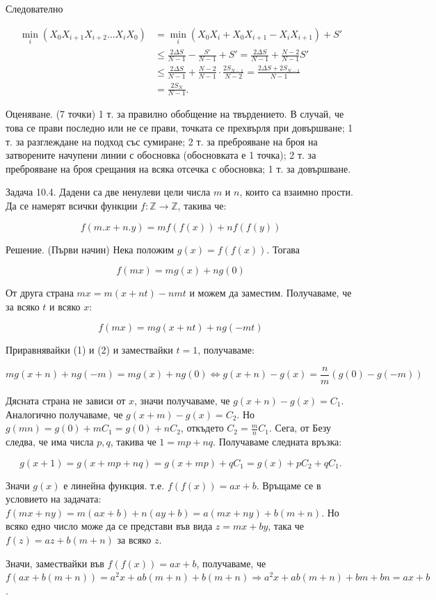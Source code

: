 Следователно

$$\begin{aligned}
\min_i(X_0X_{i+1}X_{i+2}\ldots X_iX_0)
&=\min_i(X_0X_i+X_0X_{i+1}-X_iX_{i+1})+S'\\
&\le\frac{2\Delta S}{N-1}-\frac{S'}{N-1}+S'=\frac{2\Delta S}{N-1}+\frac{N-2}{N-1}S'\\
&\le\frac{2\Delta S}{N-1}+\frac{N-2}{N-1}\cdot\frac{2S_{N-1}}{N-2}=\frac{2\Delta S+2S_{N-1}}{N-1}\\
&=\frac{2S_N}{N-1}.
\end{aligned}$$

Оценяване. (7 точки) 1 т. за правилно обобщение на твърдението. В случай, че това се прави последно или не се прави, точката се прехвърля при довършване; 1 т. за разглеждане на подход със сумиране; 2 т. за преброяване на броя на затворените начупени линии с обосновка (обосновката е 1 точка); 2 т. за преброяване на броя срещания на всяка отсечка с обосновка; 1 т. за довършване.

Задача 10.4. Дадени са две ненулеви цели числа $m$ и $n$, които са взаимно прости. Да се намерят всички функции $f:\mathbb Z\to\mathbb Z$, такива че:

$$f(m.x+n.y)=mf(f(x))+nf(f(y))$$

Решение. (Първи начин) Нека положим $g(x)=f(f(x))$. Тогава

$$f(mx)=mg(x)+ng(0)\tag{1}$$

От друга страна $mx=m(x+nt)-nmt$ и можем да заместим. Получаваме, че за всяко $t$ и всяко $x$:

$$f(mx)=mg(x+nt)+ng(-mt)\tag{2}$$

Приравнявайки (1) и (2) и замествайки $t=1$, получаваме:

$$mg(x+n)+ng(-m)=mg(x)+ng(0)\Longleftrightarrow g(x+n)-g(x)=\frac{n}{m}(g(0)-g(-m))\tag{3}$$

Дясната страна не зависи от $x$, значи получаваме, че $g(x+n)-g(x)=C_1$. Аналогично получаваме, че $g(x+m)-g(x)=C_2$. Но $g(mn)=g(0)+mC_1=g(0)+nC_2$, откъдето $C_2=\frac{m}{n}C_1$. Сега, от Безу следва, че има числа $p,q$, такива че $1=mp+nq$. Получаваме следната връзка:

$$g(x+1)=g(x+mp+nq)=g(x+mp)+qC_1=g(x)+pC_2+qC_1.$$

Значи $g(x)$ е линейна функция. т.е. $f(f(x))=ax+b$. Връщаме се в условието на задачата: $f(mx+ny)=m(ax+b)+n(ay+b)=a(mx+ny)+b(m+n)$. Но всяко едно число може да се представи във вида $z=mx+by$, така че $f(z)=az+b(m+n)$ за всяко $z$.

Значи, замествайки във $f(f(x))=ax+b$, получаваме, че $f(ax+b(m+n))=a^2x+ab(m+n)+b(m+n)\Longrightarrow a^2x+ab(m+n)+bm+bn=ax+b$.

